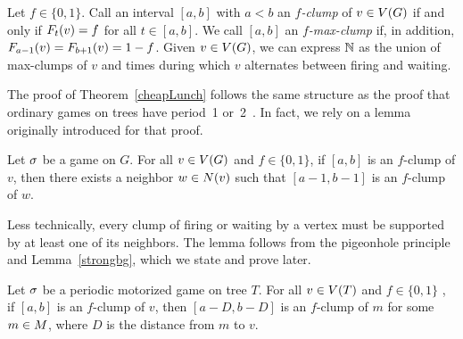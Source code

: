 Let $f \in \{0,1\}$. Call an interval $[a, b]$ with $a < b$ an \emph{$f$-clump}
of $v \in \V$ if and only if $\firing{v}{t} = f$ for all $t \in [a, b]$. We
call $[a, b]$ an \emph{$f$-max-clump} if, in addition, $\firing{v}{a-1} =
\firing{v}{b+1} = 1-f$. Given $v \in \V$, we can express $\nats$ as the union
of max-clumps of $v$ and times during which $v$ alternates between firing and
waiting.

The proof of Theorem~\ref{cheapLunch} follows the same structure as the proof
that ordinary games on trees have period~1 or~2~\cite{bitarGoles}. In fact, we
rely on a lemma originally introduced for that proof.

\begin{lem} \label{bitarGoles}
Let $\s$ be a game on $G$. For all $v \in \V$ and $f \in \{0,1\}$, if $[a, b]$
is an $f$-clump of $v$, then there exists a neighbor $w \in \N{v}$ such that
$[a-1, b-1]$ is an $f$-clump of $w$.
\end{lem}

Less technically, every clump of firing or waiting by a vertex must be
supported by at least one of its neighbors. The lemma follows from the
pigeonhole principle and Lemma~\ref{strongbg}, which we state and prove later.

\begin{thm} \label{cheapLunch}
Let $\s$ be a periodic motorized game on tree $T$. For all $v \in \V[T]$ and
$f \in \{0,1\}$ , if $[a, b]$ is an $f$-clump of $v$, then $[a-D, b-D]$ is an
$f$-clump of $m$ for some $m \in \mots$, where $D$ is the distance from $m$ to
$v$.
\end{thm}

